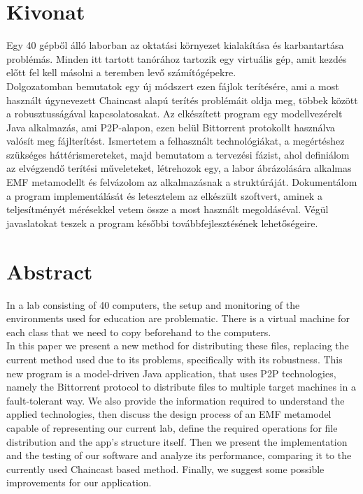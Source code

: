 \setcounter{page}{1}

\selecthungarian

\chapter*{Kivonat}

Egy 40 gépből álló laborban az oktatási környezet kialakítása és karbantartása problémás. Minden itt tartott tanórához tartozik egy virtuális gép, amit kezdés előtt fel kell másolni a teremben levő számítógépekre.\\
Dolgozatomban bemutatok egy új módszert ezen fájlok terítésére, ami a most használt úgynevezett Chaincast alapú terítés problémáit oldja meg, többek között a robusztusságával kapcsolatosakat. Az elkészített program egy modellvezérelt Java alkalmazás, ami P2P-alapon, ezen belül Bittorrent protokollt használva valósít meg fájlterítést. Ismertetem a felhasznált technológiákat, a megértéshez szükséges háttérismereteket, majd bemutatom a tervezési fázist, ahol definiálom az elvégzendő terítési műveleteket, létrehozok egy, a labor ábrázolására alkalmas EMF metamodellt és felvázolom az alkalmazásnak a struktúráját. Dokumentálom a program implementálását és letesztelem az elkészült szoftvert, aminek a teljesítményét mérésekkel vetem össze a most használt megoldáséval. Végül javaslatokat teszek a program későbbi továbbfejlesztésének lehetőségeire.
\vfill
\selectenglish
\chapter*{Abstract}

In a lab consisting of 40 computers, the setup and monitoring of the environments used for education are problematic. There is a virtual machine for each class that we need to copy beforehand to the computers.\\
In this paper we present a new method for distributing these files, replacing the current method used due to its problems, specifically with its robustness. This new program is a model-driven Java application, that uses P2P technologies, namely the Bittorrent protocol to distribute files to multiple target machines in a fault-tolerant way. We also provide the information required to understand the applied technologies, then discuss the design process of an EMF metamodel capable of representing our current lab, define the required operations for file distribution and the app's structure itself. Then we present the implementation and the testing of our software and analyze its performance, comparing it to the currently used Chaincast based method. Finally, we suggest some possible improvements for our application.
\vfill
\selectthesislanguage

\setcounter{romanPage}{\value{page}}
